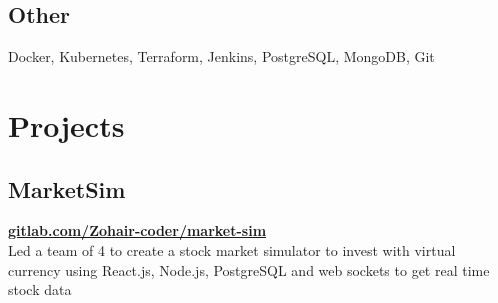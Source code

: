 \documentclass[]{deedy-resume-openfont}
\begin{document}
\begin{minipage}[t]{0.33\textwidth}
    \subsection{Other}
    Docker, Kubernetes, Terraform,
    Jenkins, PostgreSQL, MongoDB, Git
    
    
    
        
        \vspace{\topsep}
        \section {Projects}
        
        \subsection{MarketSim}
        \textbf{\href{https://gitlab.com/Zohair-coder/market-sim}{gitlab.com/Zohair-coder/market-sim}} \\
        \vspace{\topsep}
        Led a team of 4 to create a stock market simulator to invest with virtual currency using React.js, Node.js, PostgreSQL and web sockets to get real time stock data
        
        \vspace{\topsep}
        

\end{minipage}
\end{document}
